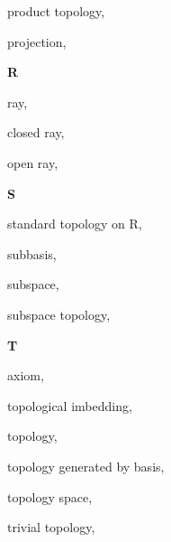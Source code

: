 \begin{multicols}{2}
product topology, \pageref{def:ProductTopology}

projection, \pageref{def:Projection}

\vspace{1em}\large{\textbf{R}}

ray, \pageref{def:Ray}

\hspace{1em}closed ray, \pageref{def:Ray}

\hspace{1em}open ray, \pageref{def:Ray}

\vspace{1em}\large{\textbf{S}}

standard topology on R, \pageref{def:StandardTopologyOnTheRealLine}

subbasis, \pageref{def:Subbasis}

subspace, \pageref{def:SubspaceTopology}

subspace topology, \pageref{def:SubspaceTopology}

\vspace{1em}\large{\textbf{T}}

 axiom, \pageref{def:T1Axiom}

topological imbedding, \pageref{def:TopologicalImbedding}

topology, \pageref{def:Topology}

topology generated by basis, \pageref{def:TopologyGeneratedByBasis}

topology space, \pageref{def:TopologySpace}

trivial topology, \pageref{def:TrivialTopology}

\end{multicols}